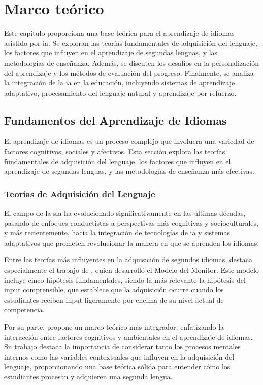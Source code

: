 \chapter{Marco teórico}
\label{marco-teorico}

Este capítulo proporciona una base teórica para el aprendizaje de idiomas asistido por \gls{ia}. Se exploran las teorías fundamentales de adquisición del lenguaje, los factores que influyen en el aprendizaje de segundas lenguas, y las metodologías de enseñanza. Además, se discuten los desafíos en la personalización del aprendizaje y los métodos de evaluación del progreso. Finalmente, se analiza la integración de la \gls{ia} en la educación, incluyendo sistemas de aprendizaje adaptativo, procesamiento del lenguaje natural y aprendizaje por refuerzo.

\section{Fundamentos del Aprendizaje de Idiomas}

El aprendizaje de idiomas es un proceso complejo que involucra una variedad de factores cognitivos, sociales y afectivos. Esta sección explora las teorías fundamentales de adquisición del lenguaje, los factores que influyen en el aprendizaje de segundas lenguas, y las metodologías de enseñanza más efectivas.

\subsection{Teorías de Adquisición del Lenguaje}

El campo de la \gls{sla} ha evolucionado significativamente en las últimas décadas, pasando de enfoques conductistas a perspectivas más cognitivas y socioculturales, y más recientemente, hacia la integración de tecnologías de \gls{ia} y sistemas adaptativos que prometen revolucionar la manera en que se aprenden los idiomas.

Entre las teorías más influyentes en la adquisición de segundos idiomas, destaca especialmente el trabajo de \cite{krashen1982principles}, quien desarrolló el Modelo del Monitor. Este modelo incluye cinco hipótesis fundamentales, siendo la más relevante la hipótesis del input comprensible, que establece que la adquisición ocurre cuando los estudiantes reciben input ligeramente por encima de su nivel actual de competencia.

Por su parte, \cite{ellis1994study} propone un marco teórico más integrador, enfatizando la interacción entre factores cognitivos y ambientales en el aprendizaje de idiomas. Su trabajo destaca la importancia de considerar tanto los procesos mentales internos como las variables contextuales que influyen en la adquisición del lenguaje, proporcionando una base teórica sólida para entender cómo los estudiantes procesan y adquieren una segunda lengua.

